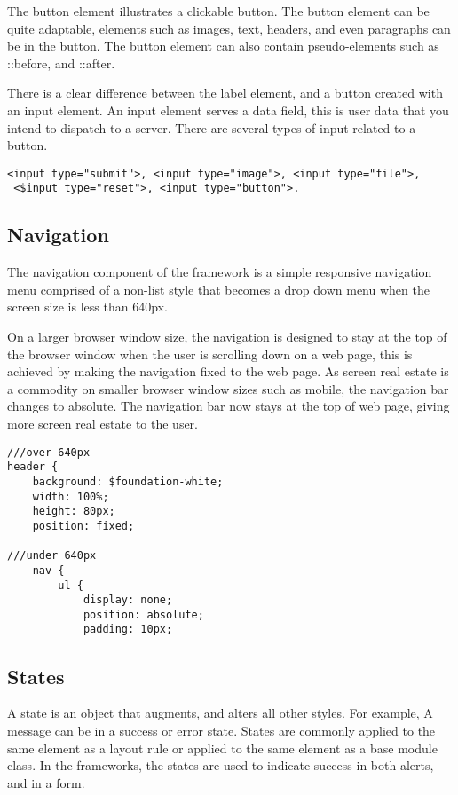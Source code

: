 The button element illustrates a clickable button. The button element can be quite adaptable, elements such as images, text, headers, and even paragraphs can be in the button. The button element can also contain pseudo-elements such as ::before, and ::after. 

There is a clear difference between the label element, and a button created with an input element. An input element serves a data field, this is user data that you intend to dispatch to a server. There are several types of input related to a button.

\begin{lstlisting}[language=CSS3]
 <input type="submit">, <input type="image">, <input type="file">, 
 <$input type="reset">, <input type="button">. 
\end{lstlisting}


\newpage
\subsection*{Navigation}
The navigation component of the framework is a simple responsive navigation menu  comprised of a non-list style that becomes a drop down menu when the screen size is less than 640px.

On a larger browser window size, the navigation is designed to stay at the top of the browser window when the user is scrolling down on a web page, this is achieved by making the navigation fixed to the web page. As screen real estate is a commodity on smaller browser window sizes such as mobile, the navigation bar changes to absolute. The navigation bar now stays at the top of web page, giving more screen real estate to the user. 

\begin{lstlisting}[language=CSS3]
///over 640px
header {
	background: $foundation-white;
	width: 100%;
	height: 80px;
	position: fixed; 
	
///under 640px			
	nav {
		ul {
			display: none;
			position: absolute;
			padding: 10px;
\end{lstlisting}

\subsection*{States}
A state is an object that augments, and alters all other styles. For example, A message can be in a success or error state. States are commonly applied to the same element as a layout rule or applied to the same element as a base module class. In the frameworks, the states are used to indicate success in both alerts, and in a form. 

